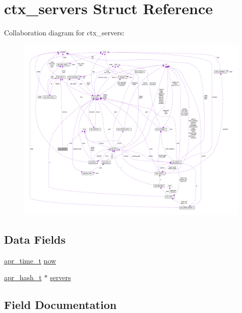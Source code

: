 \hypertarget{structctx__servers}{}\section{ctx\+\_\+servers Struct Reference}
\label{structctx__servers}


Collaboration diagram for ctx\+\_\+servers\+:
\nopagebreak
\begin{figure}[H]
\begin{center}
\leavevmode
\includegraphics[width=350pt]{structctx__servers__coll__graph}
\end{center}
\end{figure}
\subsection*{Data Fields}
\begin{DoxyCompactItemize}
\item 
\hyperlink{group__apr__time_gadb4bde16055748190eae190c55aa02bb}{apr\+\_\+time\+\_\+t} \hyperlink{structctx__servers_af3508793ee0d707275736bb40e5b3c09}{now}
\item 
\hyperlink{structapr__hash__t}{apr\+\_\+hash\+\_\+t} $\ast$ \hyperlink{structctx__servers_a89547889ea6802bc68645d03e74adf57}{servers}
\end{DoxyCompactItemize}


\subsection{Field Documentation}
